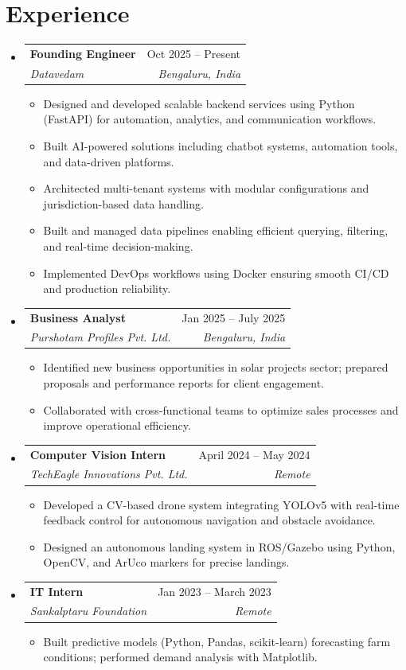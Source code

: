 \documentclass[letterpaper,10pt]{article}
\makeatletter
\newcommand{\resumeItem}[1]{
  \item\small{
    {#1 \vspace{-1pt}}
  }
}
\newcommand{\resumeSubheading}[4]{
  \vspace{-1pt}\item
    \begin{tabular*}{0.97\textwidth}[t]{l@{\extracolsep{\fill}}r}
      \textbf{#1} & #2 \\
      \textit{\small #3} & \textit{\small #4} \\
    \end{tabular*}\vspace{-5pt}
}
\newcommand{\resumeSubHeadingListStart}{\begin{itemize}[leftmargin=0.15in, label={}]}
\newcommand{\resumeSubHeadingListEnd}{\end{itemize}\vspace{-5pt}}
\newcommand{\resumeItemListStart}{\begin{itemize}\vspace{-3pt}}
\newcommand{\resumeItemListEnd}{\end{itemize}\vspace{-2pt}}
\makeatother
\begin{document}
\section{Experience}
\resumeSubHeadingListStart
    \resumeSubheading
      {Founding Engineer}{Oct 2025 -- Present}
      {Datavedam}{Bengaluru, India}
      \resumeItemListStart
        \resumeItem{Designed and developed scalable backend services using Python (FastAPI) for automation, analytics, and communication workflows.}
        \resumeItem{Built AI-powered solutions including chatbot systems, automation tools, and data-driven platforms.}
        \resumeItem{Architected multi-tenant systems with modular configurations and jurisdiction-based data handling.}
        \resumeItem{Built and managed data pipelines enabling efficient querying, filtering, and real-time decision-making.}
        \resumeItem{Implemented DevOps workflows using Docker ensuring smooth CI/CD and production reliability.}
      \resumeItemListEnd
    \resumeSubheading
      {Business Analyst}{Jan 2025 -- July 2025}
      {Purshotam Profiles Pvt. Ltd.}{Bengaluru, India}
      \resumeItemListStart
        \resumeItem{Identified new business opportunities in solar projects sector; prepared proposals and performance reports for client engagement.}
        \resumeItem{Collaborated with cross-functional teams to optimize sales processes and improve operational efficiency.}
      \resumeItemListEnd
    \resumeSubheading
      {Computer Vision Intern}{April 2024 -- May 2024}
      {TechEagle Innovations Pvt. Ltd.}{Remote}
      \resumeItemListStart
        \resumeItem{Developed a CV-based drone system integrating YOLOv5 with real-time feedback control for autonomous navigation and obstacle avoidance.}
        \resumeItem{Designed an autonomous landing system in ROS/Gazebo using Python, OpenCV, and ArUco markers for precise landings.}
      \resumeItemListEnd
    \resumeSubheading
      {IT Intern}{Jan 2023 -- March 2023}
      {Sankalptaru Foundation}{Remote}
      \resumeItemListStart
        \resumeItem{Built predictive models (Python, Pandas, scikit-learn) forecasting farm conditions; performed demand analysis with Matplotlib.}
      \resumeItemListEnd
\resumeSubHeadingListEnd
\end{document}
